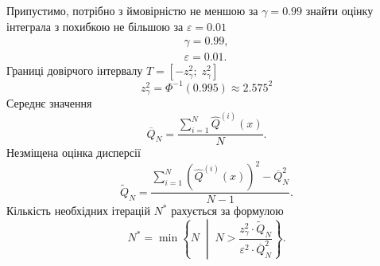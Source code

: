Припустимо,
потрібно з ймовірністю не меншою за $\gamma = 0.99$
знайти оцінку інтеграла з похибкою не більшою за $\varepsilon = 0.01$
\begin{equation*}
  \begin{split}
    \gamma = 0.99, \\
    \varepsilon = 0.01.
  \end{split}
\end{equation*}
Границі довірчого інтервалу $T = \left[ - z^2_{\gamma};\; z^2_{\gamma} \right]$
\begin{equation*}
  z^2_{\gamma} = \Phi^{-1}\left( 0.995 \right) \approx 2.575^2
\end{equation*}
Середнє значення
\begin{equation*}
  \overline{Q}_N = \frac{\sum\limits_{i=1}^{N}
    \hat{Q}^{\left( i \right)}\left( x \right)}{N}.
\end{equation*}
Незміщена оцінка дисперсії
\begin{equation*}
  \widetilde{Q}_N
  = \frac{
    \sum\limits_{i=1}^{N}
      \left( \hat{Q}^{\left( i \right)}\left( x \right) \right)^2
    - \overline{Q}_N^2}{N - 1}.
\end{equation*}
Кількість необхідних ітерацій $N^*$ рахується за формулою
\begin{equation*}
  N^* = \min{\left\{ N \;\middle|\;
    N > \frac{z^2_{\gamma} \cdot \widetilde{Q}_N}
    {\varepsilon^2 \cdot \overline{Q}_N^2} \right\}}.
\end{equation*}
